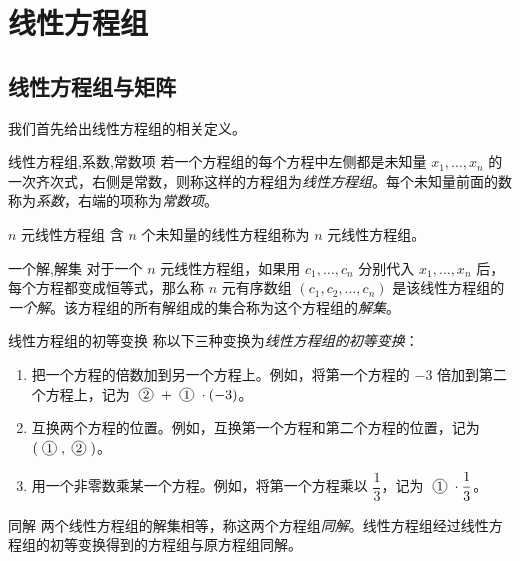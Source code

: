 
\chapter{线性方程组}

\section{线性方程组与矩阵}

我们首先给出线性方程组的相关定义。

\begin{definition}{线性方程组,系数,常数项}
	若一个方程组的每个方程中左侧都是未知量 $x_1, \ldots, x_n$ 的一次齐次式，右侧是常数，则称这样的方程组为\emph{线性方程组}。每个未知量前面的数称为\emph{系数}，右端的项称为\emph{常数项}。
\end{definition}

\begin{definition}{$n$ 元线性方程组}
	含 $n$ 个未知量的线性方程组称为 $n$ 元线性方程组。
\end{definition}

\begin{definition}{一个解,解集}
	对于一个 $n$ 元线性方程组，如果用 $c_1, \ldots, c_n$ 分别代入 $x_1, \ldots, x_n$ 后，每个方程都变成恒等式，那么称 $n$ 元有序数组 $(c_1, c_2, \ldots, c_n)$ 是该线性方程组的\emph{一个解}。该方程组的所有解组成的集合称为这个方程组的\emph{解集}。
\end{definition}

\begin{definition}{线性方程组的初等变换}
	称以下三种变换为\emph{线性方程组的初等变换}：
	\begin{enumerate}
		\item 把一个方程的倍数加到另一个方程上。例如，将第一个方程的 $-3$ 倍加到第二个方程上，记为 $\circled{2} +\circled{1} \cdot (-3)$。
		\item 互换两个方程的位置。例如，互换第一个方程和第二个方程的位置，记为 $(\circled{1}, \circled{2})$。
		\item 用一个非零数乘某一个方程。例如，将第一个方程乘以 $\dfrac{1}{3}$，记为 $\circled{1} \cdot \dfrac{1}{3}$。
	\end{enumerate}
\end{definition}

\begin{definition}{同解}
	两个线性方程组的解集相等，称这两个方程组\emph{同解}。线性方程组经过线性方程组的初等变换得到的方程组与原方程组同解。
\end{definition}

